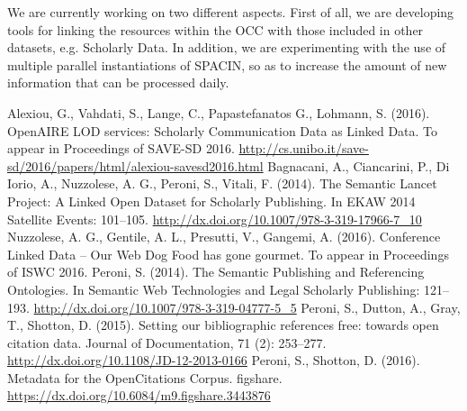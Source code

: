 \documentclass[runningheads,a4paper]{llncs}
\begin{document}
We are currently working on two different aspects. First of all, we are developing tools for linking the resources within the OCC with those included in other datasets, e.g. Scholarly Data. In addition, we are experimenting with the use of multiple parallel instantiations of SPACIN, so as to increase the amount of new information that can be processed daily. 

\begin{thebibliography}{4}

 Alexiou, G., Vahdati, S., Lange, C., Papastefanatos G., Lohmann, S. (2016). OpenAIRE LOD services: Scholarly Communication Data as Linked Data. To appear in Proceedings of SAVE-SD 2016. \url{http://cs.unibo.it/save-sd/2016/papers/html/alexiou-savesd2016.html}
 Bagnacani, A., Ciancarini, P., Di Iorio, A., Nuzzolese, A. G., Peroni, S., Vitali, F. (2014). The Semantic Lancet Project: A Linked Open Dataset for Scholarly Publishing. In EKAW 2014 Satellite Events: 101--105. \url{http://dx.doi.org/10.1007/978-3-319-17966-7\_10}
 Nuzzolese, A. G., Gentile, A. L., Presutti, V., Gangemi, A. (2016). Conference Linked Data -- Our Web Dog Food has gone gourmet. To appear in Proceedings of ISWC 2016.
 Peroni, S. (2014). The Semantic Publishing and Referencing Ontologies. In Semantic Web Technologies and Legal Scholarly Publishing: 121--193. \url{http://dx.doi.org/10.1007/978-3-319-04777-5\_5}
 Peroni, S., Dutton, A., Gray, T., Shotton, D. (2015). Setting our bibliographic references free: towards open citation data. Journal of Documentation, 71 (2): 253--277. \url{http://dx.doi.org/10.1108/JD-12-2013-0166}
 Peroni, S., Shotton, D. (2016). Metadata for the OpenCitations Corpus. figshare. \url{https://dx.doi.org/10.6084/m9.figshare.3443876}

\end{thebibliography}
\end{document}
